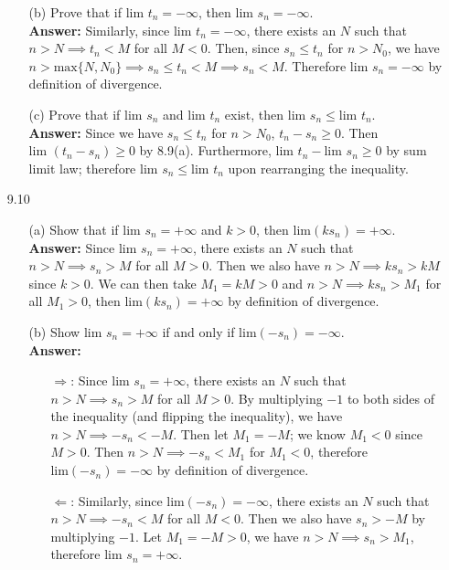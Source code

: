 \documentclass{article}
\begin{document}
\begin{itemize}
\begin{itemize}
                  \item [(b)] Prove that if $\text{lim }t_n=-\infty$, then $\text{lim }s_n=-\infty$.\\
                        \textbf{Answer: } Similarly, since $\text{lim }t_n=-\infty$, there exists an $N$ such that $n>N\implies t_n<M$ for all $M<0$. Then, since $s_n\leq t_n$ for $n>N_0$, we have $n>\text{max}\{N,N_0\}\implies s_n\leq t_n<M\implies s_n<M$. Therefore $\text{lim }s_n=-\infty$ by definition of divergence.
                  \item [(c)] Prove that if $\text{lim }s_n$ and $\text{lim }t_n$ exist, then $\text{lim }s_n\leq\text{lim }t_n$.\\
                        \textbf{Answer: } Since we have $s_n\leq t_n$ for $n>N_0$, $t_n-s_n\geq 0$. Then $\text{lim }(t_n-s_n)\geq 0$ by 8.9(a). Furthermore, $\text{lim }t_n-\text{lim }s_n\geq 0$ by sum limit law; therefore $\text{lim }s_n\leq\text{lim }t_n$ upon rearranging the inequality.
            \end{itemize}
      \item [9.10]
            \begin{itemize}
                  \item [(a)] Show that if $\text{lim }s_n=+\infty$ and $k>0$, then lim$(ks_n)=+\infty$.\\
                        \textbf{Answer: } Since $\text{lim }s_n=+\infty$, there exists an $N$ such that $n>N\implies s_n>M$ for all $M>0$. Then we also have $n>N\implies ks_n>kM$ since $k>0$. We can then take $M_1=kM>0$ and $n>N\implies ks_n>M_1$ for all $M_1>0$, then $\text{lim}(ks_n)=+\infty$ by definition of divergence.
                  \item [(b)] Show $\text{lim }s_n=+\infty$ if and only if lim$(-s_n)=-\infty$.\\
                        \textbf{Answer: }
                        \begin{itemize}
                              \item [$\Rightarrow$:] Since $\text{lim }s_n=+\infty$, there exists an $N$ such that $n>N\implies s_n>M$ for all $M>0$. By multiplying $-1$ to both sides of the inequality (and flipping the inequality), we have $n>N\implies -s_n<-M$. Then let $M_1=-M$; we know $M_1<0$ since $M>0$. Then $n>N\implies -s_n<M_1$ for $M_1<0$, therefore $\text{lim}(-s_n)=-\infty$ by definition of divergence.
                              \item [$\Leftarrow$:] Similarly, since $\text{lim}(-s_n)=-\infty$, there exists an $N$ such that $n>N\implies -s_n<M$ for all $M<0$. Then we also have $s_n>-M$ by multiplying $-1$. Let $M_1=-M>0$, we have $n>N\implies s_n>M_1$, therefore $\text{lim }s_n=+\infty$.

\end{itemize}
\end{itemize}
\end{itemize}
\end{document}

